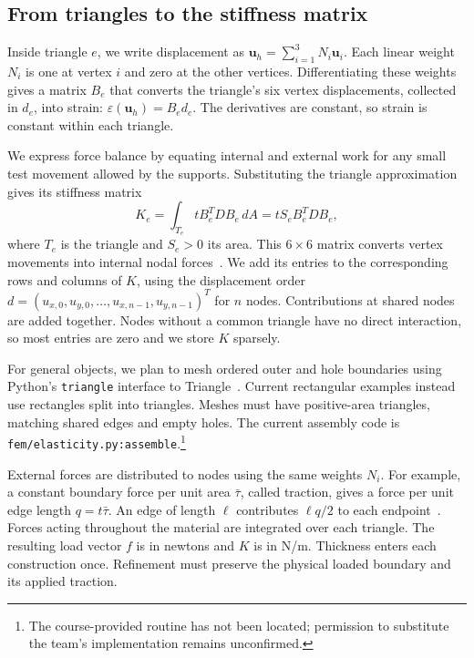 \subsection{From triangles to the stiffness matrix}
Inside triangle $e$, we write displacement as
$\mathbf{u}_h=\sum_{i=1}^3N_i\mathbf{u}_i$. Each linear weight $N_i$ is
one at vertex $i$ and zero at the other vertices. Differentiating these
weights gives a matrix $B_e$ that converts the triangle's six vertex
displacements, collected in $d_e$, into strain:
$\varepsilon(\mathbf{u}_h)=B_ed_e$. The derivatives are constant, so strain
is constant within each triangle.

We express force balance by equating internal and external work for any
small test movement allowed by the supports. Substituting the triangle
approximation gives its stiffness matrix
\begin{equation}
 K_e=\int_{T_e}tB_e^TDB_e\,dA=tS_eB_e^TDB_e,
 \label{eq:mechanics-assembly}
\end{equation}
where $T_e$ is the triangle and $S_e>0$ its area. This $6\times6$ matrix
converts vertex movements into internal nodal forces~\cite{alberta-triangles}.
We add its entries to the corresponding rows and columns of $K$, using
the displacement order $d=(u_{x,0},u_{y,0},\ldots,u_{x,n-1},u_{y,n-1})^T$
for $n$ nodes. Contributions at shared nodes are added together. Nodes
without a common triangle have no direct interaction, so most entries
are zero and we store $K$ sparsely.

For general objects, we plan to mesh ordered outer and hole boundaries
using Python's \texttt{triangle} interface to
Triangle~\cite{shewchuk-triangle}. Current rectangular examples instead
use rectangles split into triangles. Meshes must have positive-area
triangles, matching shared edges and empty holes. The current assembly
code is \texttt{fem/elasticity.py:assemble}.\footnote{The course-provided
routine has not been located; permission to substitute the team's
implementation remains unconfirmed.}

External forces are distributed to nodes using the same weights $N_i$.
For example, a constant boundary force per unit area $\bar\tau$, called
traction, gives a force per unit edge length $q=t\bar\tau$. An edge of
length $\ell$ contributes $\ell q/2$ to each endpoint~\cite{alberta-triangles}.
Forces acting throughout the material are integrated over each triangle.
The resulting load vector $f$ is in newtons and $K$ is in N/m. Thickness
enters each construction once. Refinement must preserve the physical
loaded boundary and its applied traction.

